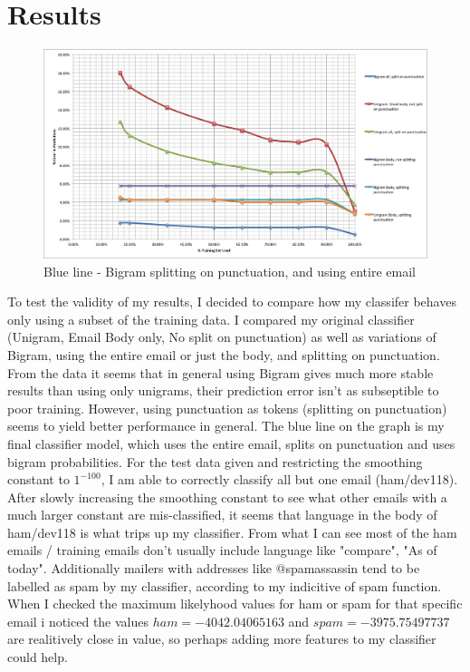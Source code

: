 \documentclass[11pt,english]{article}
\begin{document}
\section*{Results}
\begin{figure}[h!]
\includegraphics[width = \linewidth]{chrt.png}
 \caption{ Blue line - Bigram splitting on punctuation, and using entire email} 
\end{figure}
\FloatBarrier
To test the validity of my results, I decided to compare how my classifer behaves only using a subset of the training data. I compared my original classifier (Unigram, Email Body only, No split on punctuation) as well as variations of Bigram, using the entire email or just the body, and splitting on punctuation.  From the data it seems that in general using Bigram gives much more stable results than using only unigrams, their prediction error isn't as subseptible to poor training. However, using punctuation as tokens (splitting on punctuation) seems to yield better performance in general. The blue line on the graph is my final classifier model, which uses the entire email, splits on punctuation and uses bigram probabilities.  
\linebreak
	For the test data given and restricting the smoothing constant to $1^{-100}$, I am able to correctly classify all but one email (ham/dev118). After slowly increasing the smoothing constant to see what other emails with a much larger constant are mis-classified, it seems that language in the body of ham/dev118 is what trips up my classifier. From what I can see most of the ham emails / training emails don't usually include language  like "compare", "As of today". Additionally mailers with addresses like @spamassassin tend to be labelled as spam by my classifier, according to my indicitive of spam function. When I checked the maximum likelyhood values for ham or spam for that specific email i noticed the values $ ham = -4042.04065163 $ and $spam = -3975.75497737$ are realitively close in value, so perhaps adding more features to my classifier could help. 
\end{document}
